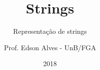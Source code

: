 \title{Strings}
\subtitle{Representação de strings}
\author{Prof. Edson Alves - UnB/FGA}
\date{2018}
